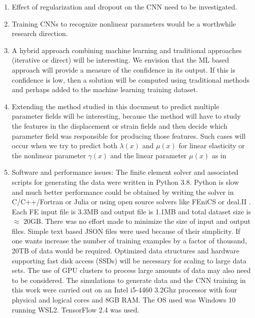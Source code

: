 \documentclass[12pt]{article}
\begin{document}
\begin{enumerate}
\item{Effect of regularization and dropout on the CNN need to be investigated.}
\item{Training CNNs to recognize nonlinear parameters would be a worthwhile research direction.}
\item{A hybrid approach combining machine learning and traditional approaches (iterative or direct) will be interesting. We envision that the ML based approach will provide a measure of the confidence in its output. If this is confidence is low, then a solution will be computed using traditional methods and perhaps added to the machine learning training dataset.}
\item{Extending the method studied in this document to predict multiple parameter fields will be interesting, because the method will have to study the features in the displacement or strain fields and then decide which parameter field was responsible for producing those features. Such cases will occur when we try to predict both $\lambda(x)$ and $\mu(x)$ for linear elasticity or the nonlinear parameter $\gamma(x)$ and the linear parameter $\mu(x)$ as in \cite{paper:gokhale2008}}
\item{Software and performance issues: The finite element solver and associated scripts for generating the data were written in Python 3.8. Python is slow and much better performance could be obtained by writing the solver in C/C++/Fortran or Julia or using open source solvers like FEniCS \cite{paper:fenics} or deal.II \cite{misc:deal.ii}. Each FE input file is 3.3MB and output file is 1.1MB and total dataset size is $\approx$  20GB. There was no effort made to minimize the size of input and output files. Simple text based JSON files were used because of their simplicity. If one wants increase the number of training examples by a factor of thousand, 20TB of data would be required. Optimized data structures and hardware supporting fast disk access (SSDs) will be necessary for scaling to large data sets. The use of GPU clusters to process large amounts of data may also need to be considered. The simulations to generate data and the CNN training in this work were carried out on an Intel i5-4460 3.2Ghz processor with four physical and logical cores and 8GB RAM. The OS used was Windows 10 running WSL2. TensorFlow 2.4 was used.}
\end{enumerate}
\clearpage
{}

\end{document}
